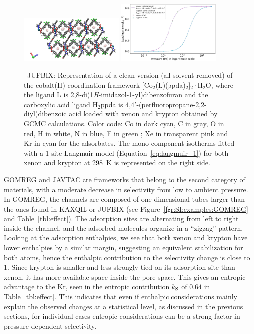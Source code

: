 \documentclass[main.tex]{subfiles}
\begin{document}
\begin{figure}[h]
  \centering
    \includegraphics[width=0.45\textwidth]{figures/2-thermo/JUFBIX_clean.jpg}
    \includegraphics[width=0.45\textwidth]{figures/2-thermo/JUFBIX_clean_isotherm_xenon_krypton_298K.jpg}
    \caption{\ JUFBIX: Representation of a clean version (all solvent removed) of the cobalt(II) coordination framework [Co$_2$(L)(ppda)$_2$]$_2\cdot$H$_2$O, where the ligand L is 2,8-di(1\emph{H}-imidazol-1-yl)dibenzofuran and the carboxylic acid ligand H$_2$ppda is 4,$4'$-(perfluoropropane-2,2-diyl)dibenzoic acid loaded with xenon and krypton obtained by GCMC calculations. Color code: Co in dark cyan, C in gray, O in red, H in white, N in blue, F in green ; Xe in transparent pink and Kr in cyan for the adsorbates. The mono-component isotherms fitted with a 1-site Langmuir model (Equation~\ref{eq:langmuir_1}) for both xenon and krypton at \SI{298}{\kelvin} is represented on the right side.}
    \label{fgr:SI:examples:JUFBIX}
  \end{figure}

GOMREG and JAVTAC are frameworks that belong to the second category of materials, with a moderate decrease in selectivity from low to ambient pressure. In GOMREG, the channels are composed of one-dimensional tubes larger than the ones found in KAXQIL or JUFBIX (see Figure~\ref{fgr:SI:examples:GOMREG} and Table~\ref{tbl:effect}). The adsorption sites are alternating from left to right inside the channel, and the adsorbed molecules organize in a ``zigzag'' pattern. Looking at the adsorption enthalpies, we see that both xenon and krypton have lower enthalpies by a similar margin, suggesting an equivalent stabilization for both atoms, hence the enthalpic contribution to the selectivity change is close to 1.
Since krypton is smaller and less strongly tied on its adsorption site than xenon, it has more available space inside the pore space. This gives an entropic advantage to the Kr, seen in the entropic contribution $k_{\text{S}}$ of $0.64$ in Table~\ref{tbl:effect}. This indicates that even if enthalpic considerations mainly explain the observed changes at a statistical level, as discussed in the previous sections, for individual cases entropic considerations can be a strong factor in pressure-dependent selectivity.
\end{document}
